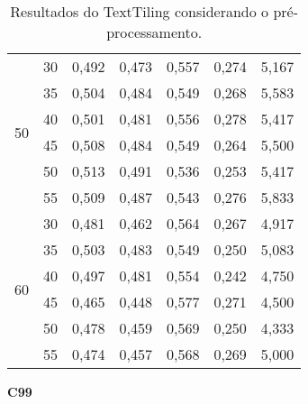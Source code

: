 \documentclass{article}
\begin{document}
\begin{table}[!h]
\begin{tabular}{|c|c||c|c|c|c|c|}
 \multirow{6}{*}{50} 
  & 30 & 0,492 & 0,473 & 0,557 & 0,274 & 5,167  \\ \cline{2-7}
  & 35 & 0,504 & 0,484 & 0,549 & 0,268 & 5,583  \\ \cline{2-7}
  & 40 & 0,501 & 0,481 & 0,556 & 0,278 & 5,417  \\ \cline{2-7}
  & 45 & 0,508 & 0,484 & 0,549 & 0,264 & 5,500  \\ \cline{2-7}
  & 50 & 0,513 & 0,491 & 0,536 & 0,253 & 5,417  \\ \cline{2-7}
  & 55 & 0,509 & 0,487 & 0,543 & 0,276 & 5,833  \\ \hline 
 \multirow{6}{*}{60} 
  & 30 & 0,481 & 0,462 & 0,564 & 0,267 & 4,917  \\ \cline{2-7}
  & 35 & 0,503 & 0,483 & 0,549 & 0,250 & 5,083  \\ \cline{2-7}
  & 40 & 0,497 & 0,481 & 0,554 & 0,242 & 4,750  \\ \cline{2-7}
  & 45 & 0,465 & 0,448 & 0,577 & 0,271 & 4,500  \\ \cline{2-7}
  & 50 & 0,478 & 0,459 & 0,569 & 0,250 & 4,333  \\ \cline{2-7}
  & 55 & 0,474 & 0,457 & 0,568 & 0,269 & 5,000  \\ \hline 
 \end{tabular}  
\caption{Resultados do TextTiling considerando o pré-processamento.}
\end{table} 



 \newpage
{  
\large
\center
	\textbf{C99}  

}
\end{document}
